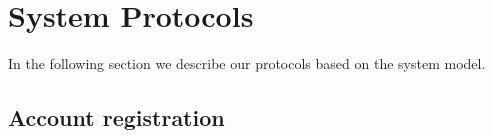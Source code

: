 

\section{System Protocols}
In the following section we describe our protocols based on the system model. 

\subsection{Account registration}

